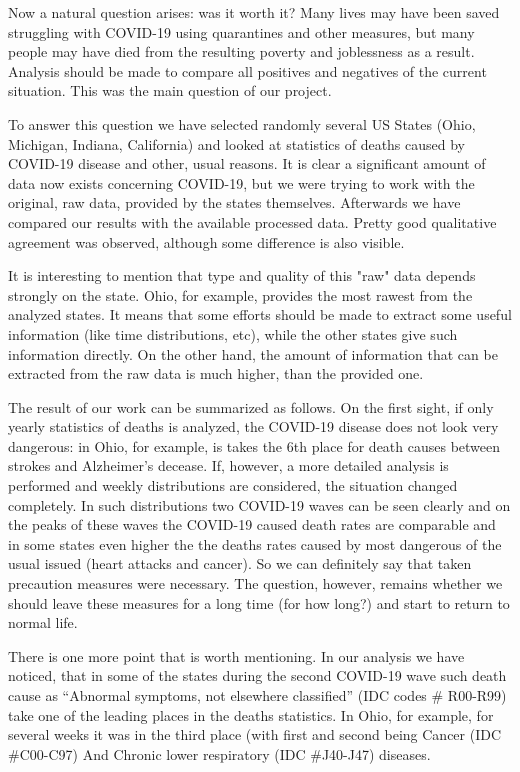 \documentclass[conference]{IEEEtran}
\begin{document}
Now a natural question arises: was it worth it? Many lives may have been saved struggling with COVID-19 using quarantines and other measures, but many people may have died from the resulting poverty and joblessness as a result. Analysis should be made to compare all positives and negatives of the current situation. This was the main question of our project.

To answer this question we have selected randomly several US States (Ohio, Michigan, Indiana, California) and looked at statistics of deaths caused by COVID-19 disease and other, usual reasons. It is clear a significant amount of data now exists concerning COVID-19, but we were trying to work with the original, raw data, provided by the states themselves. Afterwards we have compared our results with the available processed data. Pretty good qualitative agreement was observed, although some difference is also visible.

It is interesting to mention that type and quality of this "raw" data depends strongly on the state. Ohio, for example, provides the most rawest from the analyzed states. It means that some efforts should be made to extract some useful information (like time distributions, etc), while the other states give such information directly. On the other hand, the amount of information that can be extracted from the raw data is much higher, than the provided one.

The result of our work can be summarized as follows. On the first sight, if only yearly statistics of deaths is analyzed, the COVID-19 disease does not look very dangerous: in Ohio, for example, is takes the 6th place for death causes between strokes and Alzheimer’s decease. If, however, a more detailed analysis is performed and weekly distributions are considered, the situation changed completely. In such distributions two COVID-19 waves can be seen clearly and on the peaks of these waves the COVID-19 caused death rates are comparable and in some states even higher the the deaths rates caused by most dangerous of the usual issued (heart attacks and cancer). So we can definitely say that taken precaution measures were necessary. The question, however, remains whether we should leave these measures for a long time (for how long?) and  start to return to normal life.

There is one more point that is worth mentioning. In our analysis we have noticed, that in some of the states during the second COVID-19 wave such death cause as “Abnormal symptoms, not elsewhere classified” (IDC codes \# R00-R99) take one of the leading places in the deaths statistics. In Ohio, for example, for several weeks it was in the third place (with first and second being Cancer (IDC \#C00-C97) And Chronic lower respiratory (IDC \#J40-J47) diseases.





\end{document}
